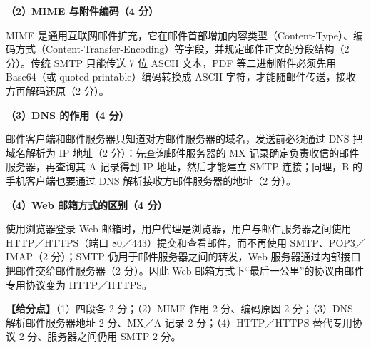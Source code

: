 \documentclass[a4paper,11pt]{article}
\begin{document}
\textbf{（2）MIME 与附件编码（4 分）}
\begin{analysis}
MIME 是通用互联网邮件扩充，它在邮件首部增加内容类型（Content-Type）、编码方式（Content-Transfer-Encoding）等字段，并规定邮件正文的分段结构（2 分）。传统 SMTP 只能传送 7 位 ASCII 文本，PDF 等二进制附件必须先用 Base64（或 quoted-printable）编码转换成 ASCII 字符，才能随邮件传送，接收方再解码还原（2 分）。
\end{analysis}

\textbf{（3）DNS 的作用（4 分）}
\begin{analysis}
邮件客户端和邮件服务器只知道对方邮件服务器的域名，发送前必须通过 DNS 把域名解析为 IP 地址（2 分）：先查询邮件服务器的 MX 记录确定负责收信的邮件服务器，再查询其 A 记录得到 IP 地址，然后才能建立 SMTP 连接；同理，B 的手机客户端也要通过 DNS 解析接收方邮件服务器的地址（2 分）。
\end{analysis}

\textbf{（4）Web 邮箱方式的区别（4 分）}
\begin{analysis}
使用浏览器登录 Web 邮箱时，用户代理是浏览器，用户与邮件服务器之间使用 HTTP／HTTPS（端口 80／443）提交和查看邮件，而不再使用 SMTP、POP3／IMAP（2 分）；SMTP 仍用于邮件服务器之间的转发，Web 服务器通过内部接口把邮件交给邮件服务器（2 分）。因此 Web 邮箱方式下“最后一公里”的协议由邮件专用协议变为 HTTP／HTTPS。
\end{analysis}

\textbf{【给分点】}（1）四段各 2 分；（2）MIME 作用 2 分、编码原因 2 分；（3）DNS 解析邮件服务器地址 2 分、MX／A 记录 2 分；（4）HTTP／HTTPS 替代专用协议 2 分、服务器之间仍用 SMTP 2 分。
\end{document}
